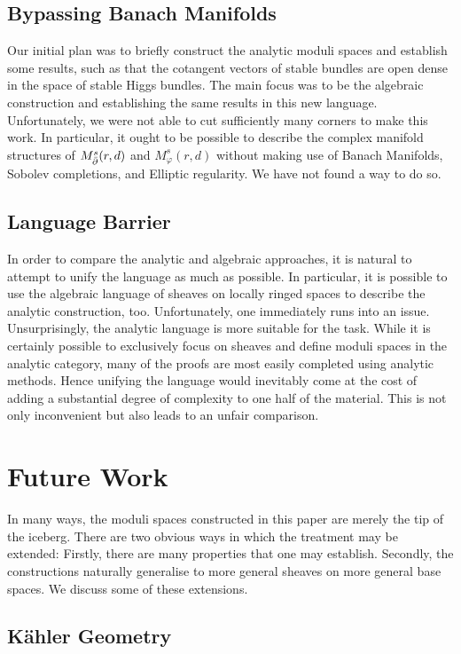\documentclass[12pt]{ociamthesis}  %
\begin{document}
\subsection{Bypassing Banach Manifolds}

Our initial plan was to briefly construct the analytic moduli spaces
and establish some results, such as that the cotangent vectors of
stable bundles are open dense in the space of stable Higgs bundles.
The main focus was to be the algebraic construction and establishing the
same results in this new language. Unfortunately, we were not able to
cut sufficiently many corners to make this work. In particular,
it ought to be possible to describe the complex
manifold structures of $M^s_{\bar{\partial}}(r,d)$ and $M^s_\varphi(r,d)$
without making use of Banach Manifolds, Sobolev completions, and
Elliptic regularity. We have not found a way to do so.

\subsection{Language Barrier}

In order to compare the analytic and algebraic approaches,
it is natural to attempt to unify the language as much as possible.
In particular, it is possible to use the algebraic language of
sheaves on locally ringed spaces to describe the analytic
construction, too. Unfortunately, one immediately runs into
an issue. Unsurprisingly, the analytic language is more suitable for the
task. While it is certainly possible to exclusively focus on
sheaves and define moduli spaces in the analytic category, many
of the proofs are most easily completed using analytic methods.
Hence unifying the language would inevitably come at the cost
of adding a substantial degree of complexity to one half of the
material. This is not only inconvenient but also leads to an
unfair comparison.

\section{Future Work}

In many ways, the moduli spaces constructed in this paper are
merely the tip of the iceberg. There are two obvious ways in which
the treatment may be extended: Firstly, there are many properties
that one may establish. Secondly, the constructions naturally generalise
to more general sheaves on more general base spaces. We discuss
some of these extensions.

\subsection{K\"ahler Geometry}
\end{document}
